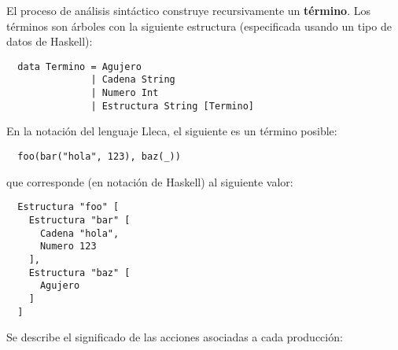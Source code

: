 \documentclass{article}
\newcommand{\lleca}{\textsf{Lleca}\xspace}
\begin{document}
El proceso de an\'alisis sint\'actico construye recursivamente un {\bf t\'ermino}.
Los t\'erminos son \'arboles con la siguiente estructura (especificada usando un tipo
de datos de Haskell):
\begin{verbatim}
  data Termino = Agujero
               | Cadena String
               | Numero Int
               | Estructura String [Termino]
\end{verbatim}
En la notaci\'on del lenguaje \lleca, el siguiente es un t\'ermino posible:
\begin{verbatim}
  foo(bar("hola", 123), baz(_))
\end{verbatim}
que corresponde (en notaci\'on de Haskell) al siguiente valor:
\begin{verbatim}
  Estructura "foo" [
    Estructura "bar" [
      Cadena "hola",
      Numero 123
    ],
    Estructura "baz" [
      Agujero
    ]
  ]
\end{verbatim}

Se describe el significado de las acciones asociadas a cada producci\'on:
\end{document}
